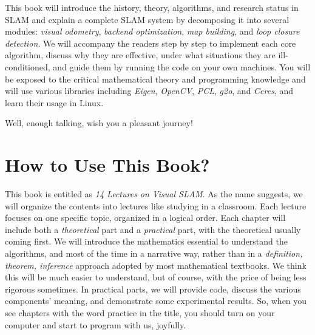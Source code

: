 This book will introduce the history, theory, algorithms, and research status in SLAM and explain a complete SLAM system by decomposing it into several modules: \textit{visual odometry}, \textit{backend optimization}, \textit{map building}, and \textit{loop closure detection}. We will accompany the readers step by step to implement each core algorithm, discuss why they are effective, under what situations they are ill-conditioned, and guide them by running the code on your own machines. You will be exposed to the critical mathematical theory and programming knowledge and will use various libraries including \textit{Eigen}, \textit{OpenCV}, \textit{PCL}, \textit{g2o}, and \textit{Ceres}, and learn their usage in Linux.

Well, enough talking, wish you a pleasant journey!

\section{How to Use This Book?}

This book is entitled as \textit{14 Lectures on Visual SLAM}. As the name suggests, we will organize the contents into lectures like studying in a classroom. Each lecture focuses on one specific topic, organized in a logical order. Each chapter will include both a \textit{theoretical} part and a \textit{practical} part, with the theoretical usually coming first. We will introduce the mathematics essential to understand the algorithms, and most of the time in a narrative way, rather than in a \textit{definition, theorem, inference} approach adopted by most mathematical textbooks. We think this will be much easier to understand, but of course, with the price of being less rigorous sometimes. In practical parts, we will provide code, discuss the various components' meaning, and demonstrate some experimental results. So, when you see chapters with the word practice in the title, you should turn on your computer and start to program with us, joyfully.

